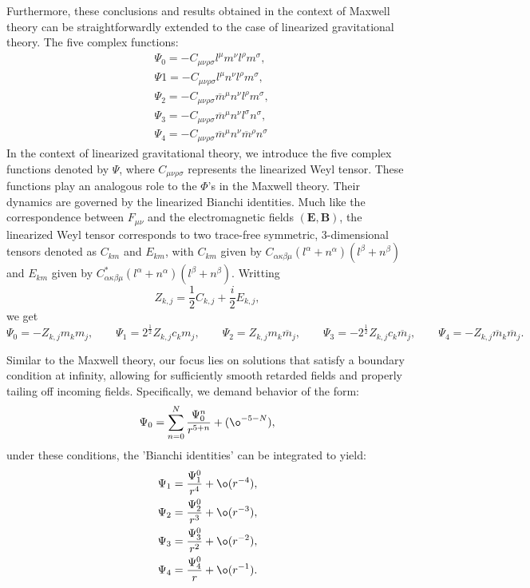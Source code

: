 Furthermore, these conclusions and results obtained in the context of Maxwell theory can be straightforwardly extended to the case of linearized gravitational theory. The five complex functions:
\begin{align}\label{eq:MaxcomplexFuc}
  & \Psi_{0} = -C_{\mu\nu\rho\sigma}l^{\mu}m^{\nu}l^{\rho}m^{\sigma}, \nonumber \\ 
  & \Psi{1} = -C_{\mu\nu\rho\sigma}l^{\mu}n^{\nu}l^{\rho}m^{\sigma}, \nonumber \\ 
  & \Psi_{2} = -C_{\mu\nu\rho\sigma}{\overline{{{m}}}^{\mu}n^{\nu}l^{\rho}m^{\sigma}}, \nonumber \\ 
  & \Psi_{3} = -C_{\mu\nu\rho\sigma}{\overline{{{m}}}^{\mu}n^{\nu}l^{\sigma}}n^{\sigma}, \nonumber \\
  & \Psi_{4} = -C_{\mu\nu\rho\sigma}{\overline{{{m}}}^{\mu}n^{\nu}\overline{{{m}}}^{\rho}}n^{\sigma}
\end{align}
In the context of linearized gravitational theory, we introduce the five complex functions denoted by $\Psi$, where $C_{\mu\nu\rho\sigma}$ represents the linearized Weyl tensor. These functions play an analogous role to the $\Phi$'s in the Maxwell theory. Their dynamics are governed by the linearized Bianchi identities. Much like the correspondence between $F_{\mu \nu}$ and the electromagnetic fields $(\boldsymbol{E}, \boldsymbol{B})$, the linearized Weyl tensor corresponds to two trace-free symmetric, 3-dimensional tensors denoted as $C_{km}$ and $E_{km}$, with $C_{km}$ given by $C_{\alpha \kappa \beta \mu}(l^{\alpha}+n^{\alpha})(l^{\beta}+n^{\beta})$ and $E_{km}$ given by $C_{\alpha \kappa \beta \mu}^{*}(l^{\alpha}+n^{\alpha})(l^{\beta}+n^{\beta})$. Writting $$Z_{k,j} = \frac{1}{2}C_{k,j} + \frac{i}{2}E_{k,j},$$ we get $$\Psi_{0} = - Z_{k,j}m_{k}m_{j}, \qquad \Psi_{1} = 2^{\frac{1}{2}}Z_{k,j}c_{k}m_{j}, \qquad \Psi_{2} = Z_{k,j}m_{k}\overline{m}_{j}, \qquad \Psi_{3} = - 2^{\frac{1}{2}}Z_{k,j}c_{k}\overline{m}_{j}, \qquad \Psi_{4} = -Z_{k,j}\overline{m}_{k}\overline{m}_{j}.$$

Similar to the Maxwell theory, our focus lies on solutions that satisfy a boundary condition at infinity, allowing for sufficiently smooth retarded fields and properly tailing off incoming fields. Specifically, we demand behavior of the form:
\begin{equation}\label{eq:Psi0ansatz}
  \Psi_{0}=\sum_{n=0}^{N}\frac{\Psi_{0}^{n}}{r^{5+n}}+(\o^{-5-N}),
\end{equation}
under these conditions, the 'Bianchi identities' can be integrated to yield:
\begin{align}\label{eq:Psiintegrals}
  & \Psi_{1}=\frac{\Psi_{1}^{0}}{r^{4}}+\o({r}^{-4}), \nonumber \\ 
  & \Psi_{2}=\frac{\Psi_{2}^{0}}{r^{3}}+\o({r}^{-3}), \nonumber \\ 
  & \Psi_{3}=\frac{\Psi_{3}^{0}}{r^{2}}+\o({r}^{-2}), \nonumber \\
  & \Psi_{4}=\frac{\Psi_{4}^{0}}{r}+\o({r}^{-1}).
\end{align}

